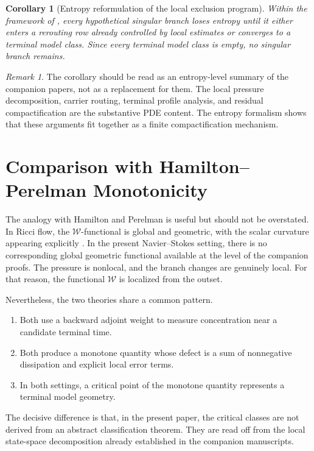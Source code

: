 \documentclass[11pt]{amsart}
\numberwithin{equation}{section}
\theoremstyle{plain}
\newtheorem{corollary}[theorem]{Corollary}
\theoremstyle{definition}
\theoremstyle{remark}
\newtheorem{remark}[theorem]{Remark}
\newcommand{\Wloc}{\mathcal W}
\begin{document}
\begin{corollary}[Entropy reformulation of the local exclusion program]
\label{cor:entropy-reformulation}
Within the framework of \cite{BallesterSetup,BallesterResidual,BallesterTypeII},
every hypothetical singular branch loses entropy until it either enters a
rerouting row already controlled by local estimates or converges to a terminal
model class.  Since every terminal model class is empty, no singular branch
remains.
\end{corollary}

\begin{remark}
The corollary should be read as an entropy-level summary of the companion
papers, not as a replacement for them.  The local pressure decomposition,
carrier routing, terminal profile analysis, and residual compactification are
the substantive PDE content.  The entropy formalism shows that these arguments
fit together as a finite compactification mechanism.
\end{remark}

\section{Comparison with Hamilton--Perelman Monotonicity}

The analogy with Hamilton and Perelman is useful but should not be overstated.
In Ricci flow, the \(\mathcal W\)-functional is global and geometric, with the
scalar curvature appearing explicitly \cite{Hamilton1982,Perelman2002}.  In the
present Navier--Stokes setting, there is no corresponding global geometric
functional available at the level of the companion proofs.  The pressure is
nonlocal, and the branch changes are genuinely local.  For that reason, the
functional \(\Wloc\) is localized from the outset.

Nevertheless, the two theories share a common pattern.
\begin{enumerate}[label=\textup{(\arabic*)},leftmargin=2.2em]
	\item Both use a backward adjoint weight to measure concentration near a
	candidate terminal time.
	\item Both produce a monotone quantity whose defect is a sum of nonnegative
	dissipation and explicit local error terms.
	\item In both settings, a critical point of the monotone quantity represents
	a terminal model geometry.
\end{enumerate}
The decisive difference is that, in the present paper, the critical classes are
not derived from an abstract classification theorem.  They are read off from
the local state-space decomposition already established in the companion
manuscripts.
\end{document}
